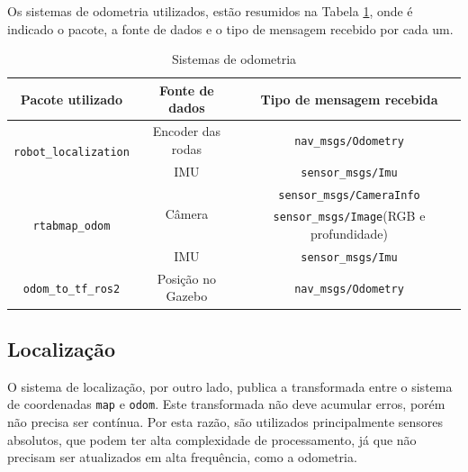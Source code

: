 \documentclass[repeatfields,xlists,xpacks,oneside,yearsonly]{ufrgscca}
\begin{document}
Os sistemas de odometria utilizados, estão resumidos na Tabela
\ref{tab:odometria}, onde é indicado o pacote, a fonte de dados e o
tipo de mensagem recebido por cada um.

\begin{table}[h]
    \begin{center}
        \caption{Sistemas de odometria}
        \label{tab:odometria}
        \begin{tabular}{c|c|c}
            Pacote utilizado                              & Fonte de dados          & Tipo de mensagem recebida                       \\
            \hline
            \multirow{2}{*}{\texttt{robot\_localization}} & Encoder das rodas       & \texttt{nav\_msgs/Odometry}                     \\
                                                          & IMU                     & \texttt{sensor\_msgs/Imu}                       \\
            \hline
            \multirow{3}{*}{\texttt{rtabmap\_odom}}       & \multirow{2}{*}{Câmera} & \texttt{sensor\_msgs/CameraInfo}                \\
                                                          &                         & \texttt{sensor\_msgs/Image}(RGB e profundidade) \\
                                                          & IMU                     & \texttt{sensor\_msgs/Imu}                       \\
            \hline
            \texttt{odom\_to\_tf\_ros2}                   & Posição no Gazebo       & \texttt{nav\_msgs/Odometry}                     \\
        \end{tabular}
    \end{center}
\end{table}

\subsection{Localização}
\label{met:localizacao}

O sistema de localização, por outro lado, publica a transformada
entre o sistema de coordenadas \texttt{map} e \texttt{odom}. Este
transformada não deve acumular erros, porém não precisa ser contínua.
Por esta razão, são utilizados principalmente sensores absolutos, que
podem ter alta complexidade de processamento, já que não precisam ser
atualizados em alta frequência, como a odometria.
\end{document}
